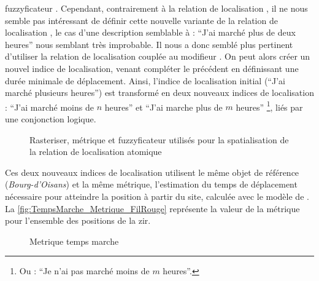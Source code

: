 fuzzyficateur . Cependant, contrairement à la
relation de localisation , il ne
nous semble pas intéressant de définir cette nouvelle variante de la
relation de localisation , le cas
d'une description semblable à : \enquote{J'ai marché plus de deux
  heures} nous semblant très improbable. Il nous a donc semblé plus
pertinent d'utiliser la relation de localisation
 couplée au modifieur
. On peut alors créer un nouvel indice de
localisation, venant compléter le précédent en définissant une durée
minimale de déplacement. Ainsi, l'indice de localisation initial
(\enquote{J'ai marché plusieurs heures}) est transformé en deux
nouveaux indices de localisation : \enquote{J'ai marché moins de \(n\)
  heures} et \enquote{J'ai marche plus de \(m\) heures} \footnote{Ou :
  \enquote{Je n'ai pas marché moins de \(m\) heures}.}, liés par une
conjonction logique.

\begin{figure}
  \centering
  
  \caption{Rasteriser, métrique et fuzzyficateur utilisés pour la
    spatialisation de la relation de localisation atomique
    \protect{}}
  \label{fig:ex_parties_statialisation_ATempsDeMarcheDe}
\end{figure}

Ces deux nouveaux indices de localisation utilisent le même objet de
référence (\ie \emph{Bourg-d'Oisans}) et la même métrique,
l'estimation du temps de déplacement nécessaire pour atteindre la
position à partir du site, calculée avec le modèle de
\textcite{Tobler1993}. La \autoref{fig:TempsMarche_Metrique_FilRouge}
représente la valeur de la métrique pour l'ensemble des positions de
la \ac{zir}.

\begin{figure}[htb]
  \centering
  
  \caption{Metrique temps marche}
  \label{fig:TempsMarche_Metrique_FilRouge}
\end{figure}

